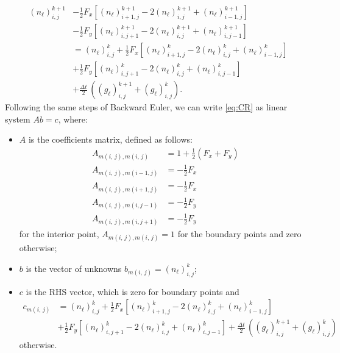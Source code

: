 \begin{align}
\left(n_{\ell}\right)_{i,j}^{k+1} & -\frac{1}{2}F_{x}\left[\left(n_{\ell}\right)_{i+1,j}^{k+1}-2\left(n_{\ell}\right)_{i,j}^{k+1}+\left(n_{\ell}\right)_{i-1,j}^{k+1}\right]\nonumber \\
 & -\frac{1}{2}F_{y}\left[\left(n_{\ell}\right)_{i,j+1}^{k+1}-2\left(n_{\ell}\right)_{i,j}^{k+1}+\left(n_{\ell}\right)_{i,j-1}^{k+1}\right]\nonumber \\
 & =\left(n_{\ell}\right)_{i,j}^{k}+\frac{1}{2}F_{x}\left[\left(n_{\ell}\right)_{i+1,j}^{k}-2\left(n_{\ell}\right)_{i,j}^{k}+\left(n_{\ell}\right)_{i-1,j}^{k}\right]\nonumber \\
 & +\frac{1}{2}F_{y}\left[\left(n_{\ell}\right)_{i,j+1}^{k}-2\left(n_{\ell}\right)_{i,j}^{k}+\left(n_{\ell}\right)_{i,j-1}^{k}\right]\nonumber \\
 & +\frac{\Delta t}{2}\,\left(\left(g_{\ell}\right)_{i,j}^{k+1}+\left(g_{\ell}\right)_{i,j}^{k}\right).\label{eq:CR}
\end{align}
Following the same steps of Backward Euler, we can write \ref{eq:CR}
as linear system $Ab=c$, where:
\begin{itemize}
\item $A$ is the coefficients matrix, defined as follows:
\begin{align*}
A_{m\left(i,\,j\right),m\left(i,\,j\right)} & =1+\frac{1}{2}\left(F_{x}+F_{y}\right)\\
A_{m\left(i,\,j\right),m\left(i-1,j\right)} & =-\frac{1}{2}F_{x}\\
A_{m\left(i,\,j\right),m\left(i+1,j\right)} & =-\frac{1}{2}F_{x}\\
A_{m\left(i,\,j\right),m\left(i,j-1\right)} & =-\frac{1}{2}F_{y}\\
A_{m\left(i,\,j\right),m\left(i,j+1\right)} & =-\frac{1}{2}F_{y}
\end{align*}
 for the interior point, $A_{m\left(i,\,j\right),m\left(i,\,j\right)}=1$
for the boundary points and zero otherwise;
\item $b$ is the vector of unknowns $b_{m\left(i,\,j\right)}=\left(n_{\ell}\right)_{i,j}^{k}$; 
\item $c$ is the RHS vector, which is zero for boundary points and 
\begin{align*}
c_{m\left(i,\,j\right)} & =\left(n_{\ell}\right)_{i,j}^{k}+\frac{1}{2}F_{x}\left[\left(n_{\ell}\right)_{i+1,j}^{k}-2\left(n_{\ell}\right)_{i,j}^{k}+\left(n_{\ell}\right)_{i-1,j}^{k}\right]\\
 & +\frac{1}{2}F_{y}\left[\left(n_{\ell}\right)_{i,j+1}^{k}-2\left(n_{\ell}\right)_{i,j}^{k}+\left(n_{\ell}\right)_{i,j-1}^{k}\right]+\frac{\Delta t}{2}\,\left(\left(g_{\ell}\right)_{i,j}^{k+1}+\left(g_{\ell}\right)_{i,j}^{k}\right)
\end{align*}
 otherwise.
\end{itemize}

